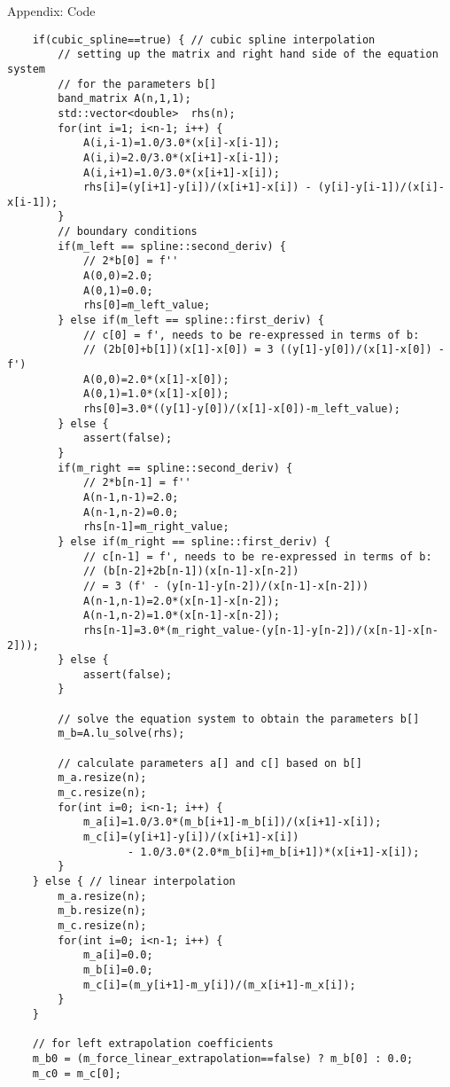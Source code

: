 \documentclass[letterpaper,12pt]{article}
\begin{document}
\begin{section}{Appendix: Code}
\begin{lstlisting}
    if(cubic_spline==true) { // cubic spline interpolation
        // setting up the matrix and right hand side of the equation system
        // for the parameters b[]
        band_matrix A(n,1,1);
        std::vector<double>  rhs(n);
        for(int i=1; i<n-1; i++) {
            A(i,i-1)=1.0/3.0*(x[i]-x[i-1]);
            A(i,i)=2.0/3.0*(x[i+1]-x[i-1]);
            A(i,i+1)=1.0/3.0*(x[i+1]-x[i]);
            rhs[i]=(y[i+1]-y[i])/(x[i+1]-x[i]) - (y[i]-y[i-1])/(x[i]-x[i-1]);
        }
        // boundary conditions
        if(m_left == spline::second_deriv) {
            // 2*b[0] = f''
            A(0,0)=2.0;
            A(0,1)=0.0;
            rhs[0]=m_left_value;
        } else if(m_left == spline::first_deriv) {
            // c[0] = f', needs to be re-expressed in terms of b:
            // (2b[0]+b[1])(x[1]-x[0]) = 3 ((y[1]-y[0])/(x[1]-x[0]) - f')
            A(0,0)=2.0*(x[1]-x[0]);
            A(0,1)=1.0*(x[1]-x[0]);
            rhs[0]=3.0*((y[1]-y[0])/(x[1]-x[0])-m_left_value);
        } else {
            assert(false);
        }
        if(m_right == spline::second_deriv) {
            // 2*b[n-1] = f''
            A(n-1,n-1)=2.0;
            A(n-1,n-2)=0.0;
            rhs[n-1]=m_right_value;
        } else if(m_right == spline::first_deriv) {
            // c[n-1] = f', needs to be re-expressed in terms of b:
            // (b[n-2]+2b[n-1])(x[n-1]-x[n-2])
            // = 3 (f' - (y[n-1]-y[n-2])/(x[n-1]-x[n-2]))
            A(n-1,n-1)=2.0*(x[n-1]-x[n-2]);
            A(n-1,n-2)=1.0*(x[n-1]-x[n-2]);
            rhs[n-1]=3.0*(m_right_value-(y[n-1]-y[n-2])/(x[n-1]-x[n-2]));
        } else {
            assert(false);
        }

        // solve the equation system to obtain the parameters b[]
        m_b=A.lu_solve(rhs);

        // calculate parameters a[] and c[] based on b[]
        m_a.resize(n);
        m_c.resize(n);
        for(int i=0; i<n-1; i++) {
            m_a[i]=1.0/3.0*(m_b[i+1]-m_b[i])/(x[i+1]-x[i]);
            m_c[i]=(y[i+1]-y[i])/(x[i+1]-x[i])
                   - 1.0/3.0*(2.0*m_b[i]+m_b[i+1])*(x[i+1]-x[i]);
        }
    } else { // linear interpolation
        m_a.resize(n);
        m_b.resize(n);
        m_c.resize(n);
        for(int i=0; i<n-1; i++) {
            m_a[i]=0.0;
            m_b[i]=0.0;
            m_c[i]=(m_y[i+1]-m_y[i])/(m_x[i+1]-m_x[i]);
        }
    }

    // for left extrapolation coefficients
    m_b0 = (m_force_linear_extrapolation==false) ? m_b[0] : 0.0;
    m_c0 = m_c[0];


\end{lstlisting}
\end{section}
\end{document}
